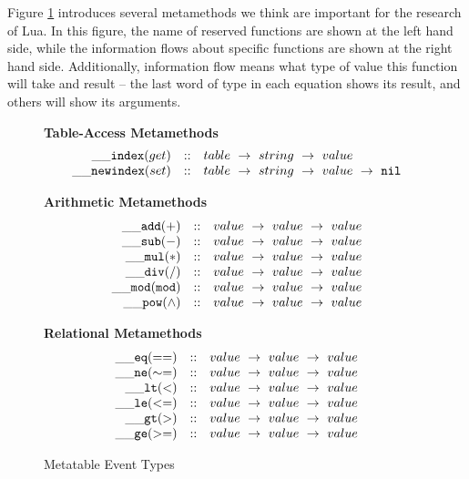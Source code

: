 Figure \ref{fig:metatables} introduces several metamethods we think are important for the research of Lua.
In this figure, the name of reserved functions are shown at the left hand side, while the information flows about specific functions are shown at the right hand side. Additionally, information flow means what type of value this function will take and result -- the last word of type in each equation shows its result, and others will show its arguments.


\begin{figure}[P]
\caption{Metatable Event Types}
{\bf Table-Access Metamethods}
\label{fig:metatables}
\[
\begin{array}{rclcl}
{\tt \_\_index}(get) & :: & {table} ~\rightarrow ~ {string} ~\rightarrow ~ {value} \\
{\tt \_\_newindex}(set) & :: & {table} ~\rightarrow ~{string} ~\rightarrow ~{value} ~\rightarrow ~{\tt nil}\\
\end{array}
\]

{\bf Arithmetic Metamethods}
\[
\begin{array}{rclcl}
{\tt \_\_add(+)} & :: & {value} ~\rightarrow ~{value}~\rightarrow ~{value}\\
{\tt \_\_sub(-)} & :: & {value} ~\rightarrow ~{value}~\rightarrow ~{value}\\
{\tt \_\_mul(*)} & :: & {value} ~\rightarrow ~{value}~\rightarrow ~{value}\\
{\tt \_\_div(/)} & :: & {value} ~\rightarrow ~{value}~\rightarrow ~{value}\\
{\tt \_\_mod(mod)} & :: & {value} ~\rightarrow ~{value}~\rightarrow ~{value}\\
{\tt \_\_pow({\wedge})} & :: & {value} ~\rightarrow ~{value}~\rightarrow ~{value}\\
\end{array}
\]

{\bf Relational Metamethods}
\[
\begin{array}{rclcl}
{\tt \_\_eq(==)} & :: & {value} ~\rightarrow ~ {value} ~\rightarrow ~ {value}\\
{\tt \_\_ne(\sim=)} & :: & {value} ~\rightarrow ~ {value} ~\rightarrow ~ {value}\\
{\tt \_\_lt(<)} & :: & {value} ~\rightarrow ~{value} ~\rightarrow ~{value}\\
{\tt \_\_le(<=)} & :: & {value} ~\rightarrow ~{value} ~\rightarrow ~{value}\\
{\tt \_\_gt(>)} & :: & {value} ~\rightarrow ~{value} ~\rightarrow ~{value}\\
{\tt \_\_ge(>=)} & :: & {value} ~\rightarrow ~{value} ~\rightarrow ~{value}\\
\end{array}
\]
\end{figure}

\newcommand{\aFunction}[2]{\lambda{#1}.{#2}}


